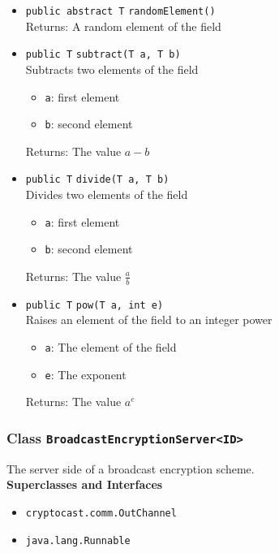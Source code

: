 \begin{itemize}
\item \lstinline|public abstract T| \lstinline|randomElement|\lstinline|()|\\
Returns: A random element of the field



\item \lstinline|public T| \lstinline|subtract|\lstinline|(T a, T b)|\\
Subtracts two elements of the field
\begin{itemize}
\item \lstinline|a|: first element
\item \lstinline|b|: second element
\end{itemize}

Returns: The value $a - b$

\item \lstinline|public T| \lstinline|divide|\lstinline|(T a, T b)|\\
Divides two elements of the field
\begin{itemize}
\item \lstinline|a|: first element
\item \lstinline|b|: second element
\end{itemize}

Returns: The value $\frac{a}{b}$

\item \lstinline|public T| \lstinline|pow|\lstinline|(T a, int e)|\\
Raises an element of the field to an integer power
\begin{itemize}
\item \lstinline|a|: The element of the field
\item \lstinline|e|: The exponent
\end{itemize}

Returns: The value $a^e$

\end{itemize}

\subsubsection{Class \lstinline|BroadcastEncryptionServer<ID>|}
The server side of a broadcast encryption scheme. \\


\textbf{Superclasses and Interfaces}
\begin{itemize}
\item \lstinline|cryptocast.comm.OutChannel|
\item \lstinline|java.lang.Runnable|
\end{itemize}

